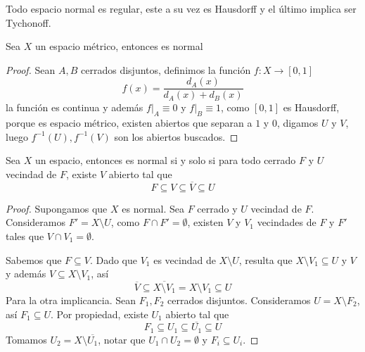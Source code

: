 \documentclass[11pt]{article}
\begin{document}
\begin{cor}
    Todo espacio normal es regular, este a su vez es Hausdorff y el último implica ser Tychonoff.
\end{cor}

\begin{teo}
    Sea $X$ un espacio métrico, entonces es normal
\end{teo}

\begin{proof}
    Sean $A,B$ cerrados disjuntos, definimos la función $f:X\to[0,1]$
    \begin{equation*}
        f(x)=\frac{d_{A}(x)}{d_{A}(x)+d_{B}(x)}
    \end{equation*}
    la función es continua y además $f\big|_{A}\equiv 0$ y $f\big|_{B}\equiv 1$, como $[0,1]$ es
    Hausdorff, porque es espacio métrico, existen abiertos que separan a $1$ y $0$, digamos $U$ y
    $V$, luego $f^{-1}(U),f^{-1}(V)$ son los abiertos buscados.
\end{proof}

\begin{teo}
    Sea $X$ un espacio, entonces es normal si y solo si para todo cerrado $F$ y $U$ vecindad de 
    $F$, existe $V$ abierto tal que
    \begin{equation*}
        F\subseteq V\subseteq\overline{V}\subseteq U
    \end{equation*}
\end{teo}

\begin{proof}
    Supongamos que $X$ es normal. Sea $F$ cerrado y $U$ vecindad de $F$. Consideramos 
    $F'=X\setminus U$, como $F\cap F'=\emptyset$, existen $V$ y $V_{1}$ vecindades de $F$ y
    $F'$ tales que $V\cap V_{1}=\emptyset$.

    \vspace{2mm}
    Sabemos que $F\subseteq V$. Dado que $V_{1}$ es vecindad de $X\setminus U$, resulta que
    $X\setminus V_{1}\subseteq U$ y $V$ y además $V\subseteq X\setminus V_{1}$, así
    \begin{equation*}
        \overline{V}\subseteq\overline{X\setminus V_{1}}=X\setminus V_{1}\subseteq U
    \end{equation*}
    Para la otra implicancia. Sean $F_{1},F_{2}$ cerrados disjuntos. Consideramos 
    $U=X\setminus F_{2}$, así $F_{1}\subseteq U$. Por propiedad, existe $U_{1}$ abierto tal
    que
    \begin{equation*}
        F_{1}\subseteq U_{1}\subseteq\overline{U_{1}}\subseteq U
    \end{equation*}
    Tomamos $U_{2}=X\setminus\overline{U_{1}}$, notar que $U_{1}\cap U_{2}=\emptyset$ y 
    $F_{i}\subseteq U_{i}$.
\end{proof}
\end{document}
